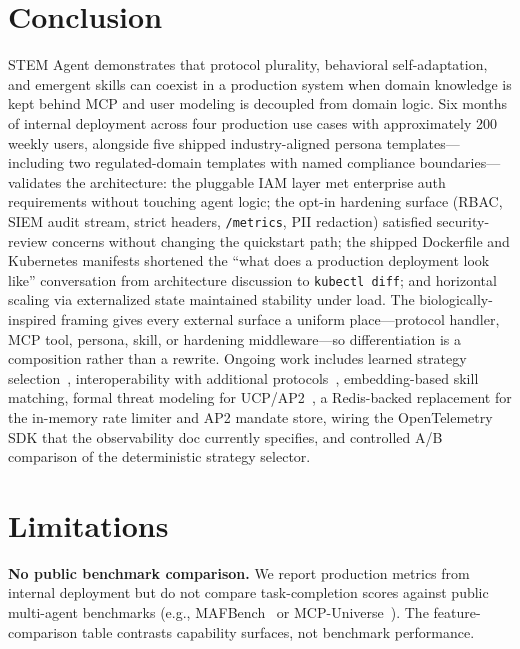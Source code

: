 \documentclass[11pt]{article}
\begin{document}
\section{Conclusion}
\label{sec:conclusion}

STEM Agent demonstrates that protocol plurality, behavioral self-adaptation, and emergent skills can coexist in a production system when domain knowledge is kept behind MCP and user modeling is decoupled from domain logic. Six months of internal deployment across four production use cases with approximately 200 weekly users, alongside five shipped industry-aligned persona templates---including two regulated-domain templates with named compliance boundaries---validates the architecture: the pluggable IAM layer met enterprise auth requirements without touching agent logic; the opt-in hardening surface (RBAC, SIEM audit stream, strict headers, \texttt{/metrics}, PII redaction) satisfied security-review concerns without changing the quickstart path; the shipped Dockerfile and Kubernetes manifests shortened the ``what does a production deployment look like'' conversation from architecture discussion to \texttt{kubectl diff}; and horizontal scaling via externalized state maintained stability under load. The biologically-inspired framing gives every external surface a uniform place---protocol handler, MCP tool, persona, skill, or hardening middleware---so differentiation is a composition rather than a rewrite. Ongoing work includes learned strategy selection~\citep{alomrani2025reasoning}, interoperability with additional protocols~\citep{chang2025anp, nie2026awcp}, embedding-based skill matching, formal threat modeling for UCP/AP2~\citep{anbiaee2026security}, a Redis-backed replacement for the in-memory rate limiter and AP2 mandate store, wiring the OpenTelemetry SDK that the observability doc currently specifies, and controlled A/B comparison of the deterministic strategy selector.

\section*{Limitations}

\textbf{No public benchmark comparison.} We report production metrics from internal deployment but do not compare task-completion scores against public multi-agent benchmarks (e.g., MAFBench~\citep{orogat2026mafbench} or MCP-Universe~\citep{luo2025mcpuniverse}). The feature-comparison table contrasts capability surfaces, not benchmark performance.
\end{document}
